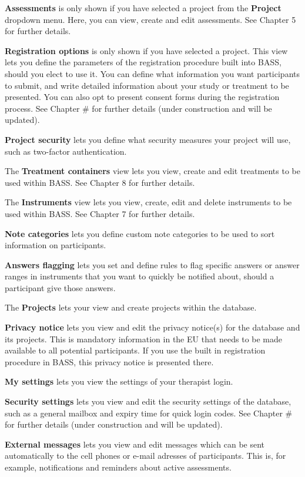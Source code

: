 \documentclass[]{book}
\begin{document}
\textbf{Assessments} is only shown if you have selected a project from the \textbf{Project} dropdown menu. Here, you can view, create and edit assessments. See Chapter 5 for further details.

\textbf{Registration options} is only shown if you have selected a project. This view lets you define the parameters of the registration procedure built into BASS, should you elect to use it. You can define what information you want participants to submit, and write detailed information about your study or treatment to be presented. You can also opt to present consent forms during the registration process. See Chapter \# for further details (under construction and will be updated).

\textbf{Project security} lets you define what security measures your project will use, such as two-factor authentication.

The \textbf{Treatment containers} view lets you view, create and edit treatments to be used within BASS. See Chapter 8 for further details.

The \textbf{Instruments} view lets you view, create, edit and delete instruments to be used within BASS. See Chapter 7 for further details.

\textbf{Note categories} lets you define custom note categories to be used to sort information on participants.

\textbf{Answers flagging} lets you set and define rules to flag specific answers or answer ranges in instruments that you want to quickly be notified about, should a participant give those answers.

The \textbf{Projects} lets your view and create projects within the database.

\textbf{Privacy notice} lets you view and edit the privacy notice(s) for the database and its projects. This is mandatory information in the EU that needs to be made available to all potential participants. If you use the built in registration procedure in BASS, this privacy notice is presented there.

\textbf{My settings} lets you view the settings of your therapist login.

\textbf{Security settings} lets you view and edit the security settings of the database, such as a general mailbox and expiry time for quick login codes. See Chapter \# for further details (under construction and will be updated).

\textbf{External messages} lets you view and edit messages which can be sent automatically to the cell phones or e-mail adresses of participants. This is, for example, notifications and reminders about active assessments.
\end{document}
